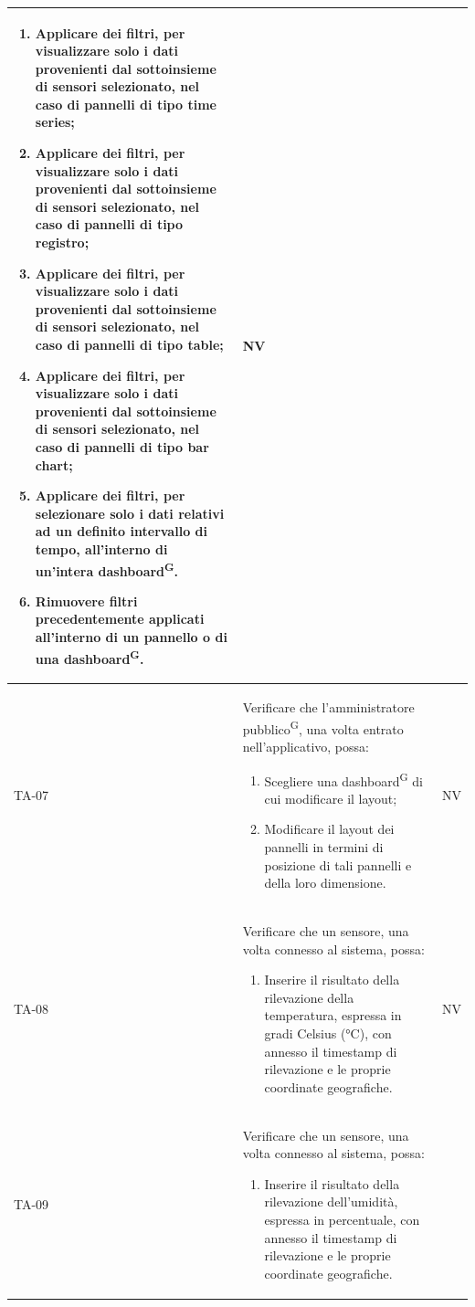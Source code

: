 \documentclass[8pt]{article}
\newcommand{\glossterm}[1]{#1\textsuperscript{G}} %
\begin{document}
\begin{longtable}{|>{\centering}p{2cm}|>{\RaggedRight}m{12cm}|>{\centering\arraybackslash}p{2cm}|}
\begin{enumerate}
        \item Applicare dei filtri, per visualizzare solo i dati provenienti dal sottoinsieme di sensori selezionato, nel caso di pannelli di tipo time series; 
        \item Applicare dei filtri, per visualizzare solo i dati provenienti dal sottoinsieme di sensori selezionato, nel caso di pannelli di tipo registro;
        \item Applicare dei filtri, per visualizzare solo i dati provenienti dal sottoinsieme di sensori selezionato, nel caso di pannelli di tipo table;
        \item Applicare dei filtri, per visualizzare solo i dati provenienti dal sottoinsieme di sensori selezionato, nel caso di pannelli di tipo bar chart;  
        \item Applicare dei filtri, per selezionare solo i dati relativi ad un definito intervallo di tempo, all’interno di un’intera \glossterm{dashboard}.
        \item Rimuovere filtri precedentemente applicati all'interno di un pannello o di una \glossterm{dashboard}.
    \end{enumerate}
    & NV \\
    \hline
    TA-07 & Verificare che l’\glossterm{amministratore pubblico}, una volta entrato
    nell’applicativo, possa:
    \begin{enumerate}
        \item Scegliere una \glossterm{dashboard} di cui modificare il layout;
        \item Modificare il layout dei pannelli in termini di posizione di tali pannelli e della loro dimensione.
    \end{enumerate}
    & NV \\
    \hline
    TA-08 &
    Verificare che un sensore, una volta connesso al sistema, possa:
    \begin{enumerate}
        \item Inserire il risultato della rilevazione della temperatura, espressa in gradi Celsius
            (°C), con annesso il timestamp di rilevazione e le proprie coordinate geografiche.        
    \end{enumerate}
    & NV \\
    \hline
    TA-09 &
    Verificare che un sensore, una volta connesso al sistema, possa:
    \begin{enumerate}
    \item Inserire il risultato della rilevazione dell’umidità, espressa in percentuale, con annesso il timestamp di rilevazione e le proprie coordinate geografiche.

\end{enumerate}
\end{longtable}
\end{document}
